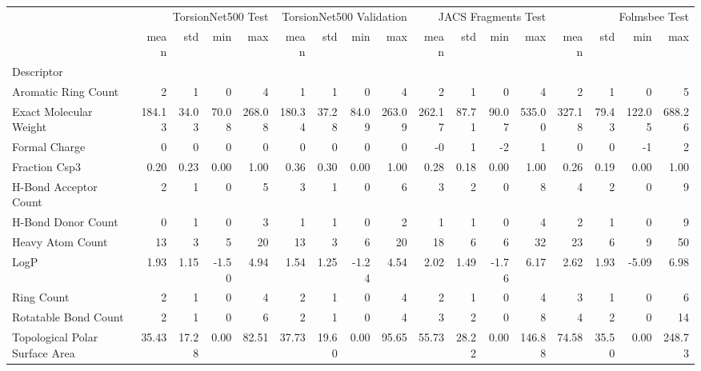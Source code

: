\begin{tabular}{lrrrrrrrrrrrrrrrr}
\toprule
 & \multicolumn{4}{r}{TorsionNet500 Test} & \multicolumn{4}{r}{TorsionNet500 Validation} & \multicolumn{4}{r}{JACS Fragments Test} & \multicolumn{4}{r}{Folmsbee Test} \\
 & mean & std & min & max & mean & std & min & max & mean & std & min & max & mean & std & min & max \\
Descriptor &  &  &  &  &  &  &  &  &  &  &  &  &  &  &  &  \\
\midrule
Aromatic Ring Count & 2 & 1 & 0 & 4 & 1 & 1 & 0 & 4 & 2 & 1 & 0 & 4 & 2 & 1 & 0 & 5 \\
Exact Molecular Weight & 184.13 & 34.03 & 70.08 & 268.08 & 180.34 & 37.28 & 84.09 & 263.09 & 262.17 & 87.71 & 90.07 & 535.00 & 327.18 & 79.43 & 122.05 & 688.26 \\
Formal Charge & 0 & 0 & 0 & 0 & 0 & 0 & 0 & 0 & -0 & 1 & -2 & 1 & 0 & 0 & -1 & 2 \\
Fraction Csp3 & 0.20 & 0.23 & 0.00 & 1.00 & 0.36 & 0.30 & 0.00 & 1.00 & 0.28 & 0.18 & 0.00 & 1.00 & 0.26 & 0.19 & 0.00 & 1.00 \\
H-Bond Acceptor Count & 2 & 1 & 0 & 5 & 3 & 1 & 0 & 6 & 3 & 2 & 0 & 8 & 4 & 2 & 0 & 9 \\
H-Bond Donor Count & 0 & 1 & 0 & 3 & 1 & 1 & 0 & 2 & 1 & 1 & 0 & 4 & 2 & 1 & 0 & 9 \\
Heavy Atom Count & 13 & 3 & 5 & 20 & 13 & 3 & 6 & 20 & 18 & 6 & 6 & 32 & 23 & 6 & 9 & 50 \\
LogP & 1.93 & 1.15 & -1.50 & 4.94 & 1.54 & 1.25 & -1.24 & 4.54 & 2.02 & 1.49 & -1.76 & 6.17 & 2.62 & 1.93 & -5.09 & 6.98 \\
Ring Count & 2 & 1 & 0 & 4 & 2 & 1 & 0 & 4 & 2 & 1 & 0 & 4 & 3 & 1 & 0 & 6 \\
Rotatable Bond Count & 2 & 1 & 0 & 6 & 2 & 1 & 0 & 4 & 3 & 2 & 0 & 8 & 4 & 2 & 0 & 14 \\
Topological Polar Surface Area & 35.43 & 17.28 & 0.00 & 82.51 & 37.73 & 19.60 & 0.00 & 95.65 & 55.73 & 28.22 & 0.00 & 146.88 & 74.58 & 35.50 & 0.00 & 248.73 \\
\bottomrule
\end{tabular}
